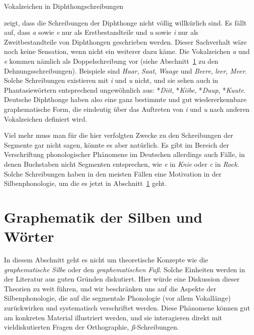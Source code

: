\begin{Vertiefung}{Vokalzeichen in Diphthongschreibungen}
\label{vert:diphthongschreibungen}

\noindent \citet[299]{Eisenberg2013a} zeigt, dass die Schreibungen der Diphthonge nicht völlig willkürlich sind.
Es fällt auf, dass \textit{a} sowie \textit{e} nur als Erstbestandteile und \textit{u} sowie \textit{i} nur als Zweitbestandteile von Diphthongen geschrieben werden.
Dieser Sachverhalt wäre noch keine Sensation, wenn nicht ein weiterer dazu käme.
Die Vokalzeichen \textit{a} und \textit{e} kommen nämlich als Doppelschreibung vor (siehe Abschnitt~\ref{sec:graphematikdersilbenundwoerter} zu den Dehnungsschreibungen).
Beispiele sind \textit{Haar}, \textit{Saat}, \textit{Waage} und \textit{Beere}, \textit{leer}, \textit{Meer}.
Solche Schreibungen existieren mit \textit{i} und \textit{u} nicht, und sie sehen auch in Phantasiewörtern entsprechend ungewöhnlich aus: *\textit{Diit}, *\textit{Kiibe}, *\textit{Duup}, *\textit{Kuute}.
Deutsche Diphthonge haben also eine ganz bestimmte und gut wiedererkennbare graphematische Form, die eindeutig über das Auftreten von \textit{i} und \textit{u} nach anderen Vokalzeichen definiert wird.
\end{Vertiefung}

Viel mehr muss man für die hier verfolgten Zwecke zu den Schreibungen der Segmente gar nicht sagen, könnte es aber natürlich.
Es gibt im Bereich der Verschriftung phonologischer Phänomene im Deutschen allerdings auch Fälle, in denen Buchstaben nicht Segmenten entsprechen, wie \textit{e} in \textit{Knie} oder \textit{c} in \textit{Rock}.
Solche Schreibungen haben in den meisten Fällen eine Motivation in der Silbenphonologie, um die es jetzt in Abschnitt~\ref{sec:graphematikdersilbenundwoerter} geht.


\section{Graphematik der Silben und Wörter}
\label{sec:graphematikdersilbenundwoerter}

In diesem Abschnitt geht es nicht um theoretische Konzepte wie die \textit{graphematische Silbe} oder den \textit{graphematischen Fuß}.
Solche Einheiten werden in der Literatur aus guten Gründen diskutiert.
Hier würde eine Diskussion dieser Theorien zu weit führen, und wir beschränken uns auf die Aspekte der Silbenphonologie, die auf die segmentale Phonologie (vor allem Vokallänge) zurückwirken und systematisch verschriftet werden.
Diese Phänomene können gut am konkreten Material illustriert werden, und sie interagieren direkt mit vieldiskutierten Fragen der Orthographie, \zB \textit{ß}-Schreibungen.

